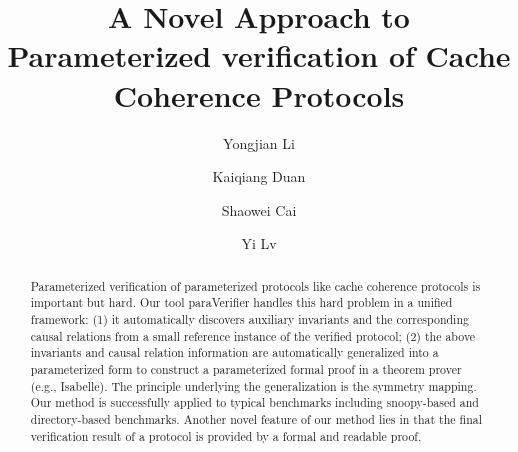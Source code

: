 \documentclass[final]{IEEEtran}
\begin{document}
\title{ {\sf A Novel Approach to Parameterized verification of Cache Coherence Protocols}
}
\author{Yongjian Li  \and
        Kaiqiang Duan  \and
        Shaowei Cai  \and
        Yi Lv
}
\maketitle
\begin{abstract}
Parameterized verification of parameterized protocols like cache coherence protocols is important
but hard.   Our tool {\sf paraVerifier} handles this hard problem in
a unified framework: (1) it automatically  discovers auxiliary invariants and the
corresponding causal relations %
 from a small reference instance of the verified protocol; (2) the above
invariants and causal relation information  are automatically generalized into a parameterized
form to construct a parameterized formal proof in a theorem prover
(e.g., Isabelle). The principle underlying the generalization is the
symmetry mapping. Our method is successfully applied to typical
benchmarks including  snoopy-based and directory-based benchmarks. Another novel
feature of our method lies in that the final verification result of a
protocol is provided by a formal and readable proof.%

\end{abstract}

\end{document}
